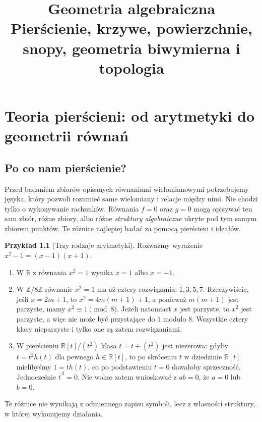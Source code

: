 \documentclass[11pt,a4paper,openany]{report}
\title{Geometria algebraiczna\\[3pt]\large Pierścienie, krzywe, powierzchnie, snopy, geometria biwymierna i topologia}
\author{}
\date{}
\numberwithin{equation}{section}
\theoremstyle{plain}
\theoremstyle{definition}
\newtheorem{przyklad}[twierdzenie]{Przykład}
\theoremstyle{remark}
\newcommand{\Z}{\mathbb Z}
\newcommand{\R}{\mathbb R}
\begin{document}
\hypersetup{pageanchor=false}
\maketitle
\hypersetup{pageanchor=true}
\tableofcontents
\clearpage
{}
\setcounter{chapter}{-1}

\chapter{Teoria pierścieni: od arytmetyki do geometrii równań}
\label{ch:pierscienie}

\providecommand{\atlasref}[2]{#2}

\section{Po co nam pierścienie?}

Przed badaniem zbiorów opisanych równaniami wielomianowymi potrzebujemy języka,
który pozwoli rozumieć same wielomiany i relacje między nimi. Nie chodzi tylko
 o wykonywanie rachunków. Równania $f=0$ oraz $g=0$ mogą opisywać ten sam zbiór,
różne zbiory, albo różne \emph{struktury algebraiczne} ukryte pod tym samym
zbiorem punktów. Te różnice najlepiej badać za pomocą pierścieni i ideałów.

\begin{przyklad}[Trzy rodzaje arytmetyki]
Rozważmy wyrażenie $x^2-1=(x-1)(x+1)$.
\begin{enumerate}[label=\arabic*)]
\item W $\R$ z równania $x^2=1$ wynika $x=1$ albo $x=-1$.
\item W $\Z/8\Z$ równanie $x^2=1$ ma aż cztery rozwiązania:
$\overline1,\overline3,\overline5,\overline7$.
Rzeczywiście, jeśli $x=2m+1$, to $x^2=4m(m+1)+1$, a ponieważ $m(m+1)$
jest parzyste, mamy $x^2\equiv1\pmod8$.
Jeżeli natomiast $x$ jest parzyste, to $x^2$ jest parzyste,
a więc nie może być przystające do $1$ modulo $8$.
Wszystkie cztery klasy nieparzyste i tylko one są zatem rozwiązaniami.
\item W pierścieniu $\R[t]/(t^2)$ klasa $\overline t=t+(t^2)$
jest niezerowa: gdyby $t=t^2h(t)$ dla pewnego $h\in\R[t]$,
to po skróceniu $t$ w dziedzinie $\R[t]$ mielibyśmy
$1=th(t)$, co po podstawieniu $t=0$ dawałoby sprzeczność.
Jednocześnie $\overline t^{\,2}=0$. Nie wolno zatem wnioskować
z $ab=0$, że $a=0$ lub $b=0$.
\end{enumerate}
Te różnice nie wynikają z odmiennego zapisu symboli, lecz z własności
struktury, w której wykonujemy działania.
\end{przyklad}
\end{document}
